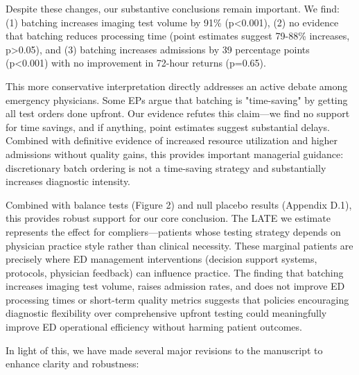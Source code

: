 \documentclass[11pt]{article}
\newcommand{\1}{\hbox{\rm 1\kern-.35em 1}}
\begin{document}
{Despite these changes, our substantive conclusions remain important. We find: (1) batching increases imaging test volume by 91\% (p<0.001), (2) no evidence that batching reduces processing time (point estimates suggest 79-88\% increases, p>0.05), and (3) batching increases admissions by 39 percentage points (p<0.001) with no improvement in 72-hour returns (p=0.65).

This more conservative interpretation directly addresses an active debate among emergency physicians. Some EPs argue that batching is "time-saving" by getting all test orders done upfront. Our evidence refutes this claim—we find no support for time savings, and if anything, point estimates suggest substantial delays. Combined with definitive evidence of increased resource utilization and higher admissions without quality gains, this provides important managerial guidance: discretionary batch ordering is not a time-saving strategy and substantially increases diagnostic intensity.

Combined with balance tests (Figure 2) and null placebo results (Appendix D.1), this provides robust support for our core conclusion. The LATE we estimate represents the effect for compliers—patients whose testing strategy depends on physician practice style rather than clinical necessity. These marginal patients are precisely where ED management interventions (decision support systems, protocols, physician feedback) can influence practice. The finding that batching increases imaging test volume, raises admission rates, and does not improve ED processing times or short-term quality metrics suggests that policies encouraging diagnostic flexibility over comprehensive upfront testing could meaningfully improve ED operational efficiency without harming patient outcomes.

In light of this, we have made several major revisions to the manuscript to enhance clarity and robustness:

}
\end{document}
